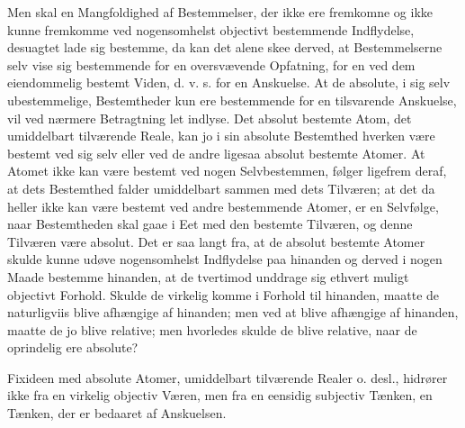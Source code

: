 \documentclass[11pt]{book}
\newcommand{\opage}[1]{\marginnote{\footnotesize\textit{[#1]}}}
\begin{document}
Men skal en Mangfoldighed af Bestemmelser, der ikke ere fremkomne
og ikke kunne fremkomme ved nogensomhelst objectivt bestemmende
Indflydelse, desuagtet lade sig bestemme, da kan det alene skee
derved, at Bestemmelserne selv vise sig bestemmende for en
oversvævende Opfatning, for en ved dem eiendommelig bestemt Viden,
d. v. s. for en Anskuelse. At de absolute, i sig selv
ubestemmelige, Bestemtheder kun ere bestemmende for en tilsvarende
Anskuelse, vil ved nærmere Betragtning let indlyse. Det absolut
bestemte Atom, det umiddelbart tilværende Reale, kan jo i sin
absolute Bestemthed hverken være bestemt ved sig selv eller ved de
andre ligesaa absolut bestemte Atomer. At Atomet ikke kan være
bestemt ved nogen Selvbestemmen, følger ligefrem deraf, at dets
Bestemthed falder umiddelbart sammen med dets Tilværen; at det da
heller ikke kan være bestemt ved andre bestemmende
\opage{14} \setcounter{footnote}{0}%
Atomer, er en Selvfølge, naar Bestemtheden skal gaae i Eet med den
bestemte Tilværen, og denne Tilværen være absolut. Det er saa langt
fra, at de absolut bestemte Atomer skulde kunne udøve nogensomhelst
Indflydelse paa hinanden og derved i nogen Maade bestemme hinanden,
at de tvertimod unddrage sig ethvert muligt objectivt Forhold. Skulde
de virkelig komme i Forhold til hinanden, maatte de naturligviis
blive afhængige af hinanden; men ved at blive afhængige af hinanden,
maatte de jo blive relative; men hvorledes skulde de blive relative,
naar de oprindelig ere absolute?

Fixideen med absolute Atomer, umiddelbart tilværende Realer
o. desl., hidrører ikke fra en virkelig objectiv Væren, men fra en
eensidig subjectiv Tænken, en Tænken, der er bedaaret af Anskuelsen.
\end{document}

